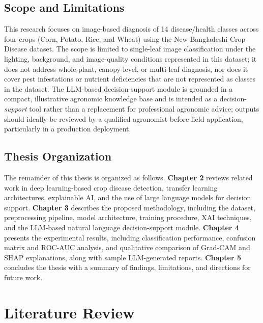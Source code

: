 \documentclass[12pt,a4paper,oneside]{report}
\begin{document}
\section{Scope and Limitations}
This research focuses on image-based diagnosis of 14 disease/health classes across four crops (Corn, Potato,
Rice, and Wheat) using the New Bangladeshi Crop Disease dataset. The scope is limited to single-leaf image
classification under the lighting, background, and image-quality conditions represented in this dataset; it does
not address whole-plant, canopy-level, or multi-leaf diagnosis, nor does it cover pest infestations or nutrient
deficiencies that are not represented as classes in the dataset. The LLM-based decision-support module is
grounded in a compact, illustrative agronomic knowledge base and is intended as a decision-\emph{support} tool
rather than a replacement for professional agronomic advice; outputs should ideally be reviewed by a qualified
agronomist before field application, particularly in a production deployment.

\section{Thesis Organization}
The remainder of this thesis is organized as follows. \textbf{Chapter 2} reviews related work in deep
learning-based crop disease detection, transfer learning architectures, explainable AI, and the use of large
language models for decision support. \textbf{Chapter 3} describes the proposed methodology, including the
dataset, preprocessing pipeline, model architecture, training procedure, XAI techniques, and the LLM-based
natural language decision-support module. \textbf{Chapter 4} presents the experimental results, including
classification performance, confusion matrix and ROC-AUC analysis, and qualitative comparison of Grad-CAM and
SHAP explanations, along with sample LLM-generated reports. \textbf{Chapter 5} concludes the thesis with a
summary of findings, limitations, and directions for future work.

\chapter{Literature Review}
\label{ch:litreview}
\end{document}
